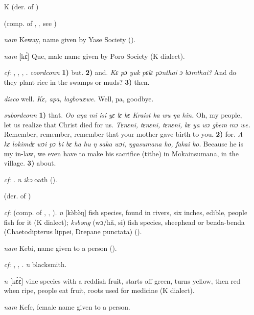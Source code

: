\begin{letter}{K}
 (der. of ) 

 (comp. of , , see ) 

 \textit{nam} Keway, name given by Yase Society (\citealt{Pichl1967}). 

 \textit{nam} [kɛ́] Que, male name given by Poro Society (K dialect). 

 \textit{cf}: , , , . \textit{coordconn} \textbf{1)} but. \textbf{2)} and. \textit{Kɛ pɔ yuk pɛlɛ pɔnthai ɔ bɔmthai?} And do they plant rice in the swamps or muds? \textbf{3)} then.

 \textit{disco} well. \textit{Kɛ, apa, lagbowɛwe.} Well, pa, goodbye.

 \textit{subordconn} \textbf{1)} that. \textit{Oo aŋa mi isi yɛ lɛ kɛ Kraist ka wu ŋa hin.} Oh, my people, let us realize that Christ died for us. \textit{Tɛnɛni, tɛnɛni, tɛnɛni, kɛ ya wɔ gbem mɔ we.} Remember, remember, remember that your mother gave birth to you. \textbf{2)} for. \textit{A kɛ lokimdɛ wɔi pɔ bi bɛ ha hu ŋ saka wɔi, ŋgasumana ko, fakai ko.} Because he is my in-law, we even have to make his sacrifice (tithe) in Mokainsumana, in the village. \textbf{3)} about.

 \textit{cf}: . \textit{n} \textit{ikə} oath (\citealt{Pichl1967}).

 (der. of ) 

 \textit{cf}:  (comp. of , , ). \textit{n} [kǝ̀bǝ̀ŋ] fish species, found in rivers, six inches, edible, people fish for it (K dialect); \textit{kəbəng} (wɔ/hã, si) fish species, sheephead or benda-benda (Chaetodipterus lippei, Drepane punctata) (\citealt{Pichl1967}).

 \textit{nam} Kebi, name given to a person (\citealt{Pichl1967}). 

 \textit{cf}: , , . \textit{n} blacksmith.

 \textit{n} [kɛ̀ɛ̀] vine species with a reddish fruit, starts off green, turns yellow, then red when ripe, people eat fruit, roots used for medicine (K dialect).

 \textit{nam} Kefe, female name given to a person. 


\end{letter}
